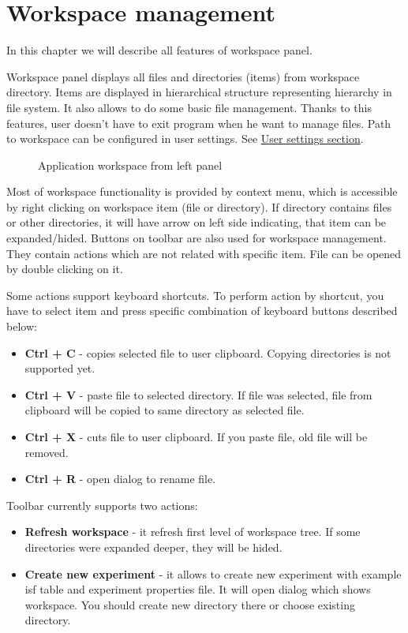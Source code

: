 \section{Workspace management}\label{section:workspace}

In this chapter we will describe all features of workspace panel.

Workspace panel displays all files and directories (items) from workspace directory. Items are displayed in hierarchical structure representing hierarchy in file system. It also allows to do some basic file management. Thanks to this features, user doesn't have to exit program when he want to manage files. Path to workspace can be configured in user settings. See \hyperref[section:user-settings]{User settings section}.

\begin{figure*}[!ht] 
	\centering
	\caption{Application workspace from left panel}
\end{figure*}

Most of workspace functionality is provided by context menu, which is accessible by right clicking on workspace item (file or directory). If directory contains files or other directories, it will have arrow on left side indicating, that item can be expanded/hided. Buttons on toolbar are also used for workspace management. They contain actions which are not related with specific item. File can be opened by double clicking on it.

Some actions support keyboard shortcuts. To perform action by shortcut, you have to select item and press specific combination of keyboard buttons described below:
\begin{itemize}
	\item \textbf{Ctrl + C} - copies selected file to user clipboard. Copying directories is not supported yet.
	\item \textbf{Ctrl + V} - paste file to selected directory. If file was selected, file from clipboard will be copied to same directory as selected file.
	\item \textbf{Ctrl + X} - cuts file to user clipboard. If you paste file, old file will be removed.
	\item \textbf{Ctrl + R} - open dialog to rename file.
\end{itemize}


Toolbar currently supports two actions:

\begin{itemize}
	\item \textbf{Refresh workspace} - it refresh first level of workspace tree. If some directories were expanded deeper, they will be hided.
	\item \textbf{Create new experiment} - it allows to create new experiment with example isf table and experiment properties file. It will open dialog which shows workspace. You should create new directory there or choose existing directory.
\end{itemize}


